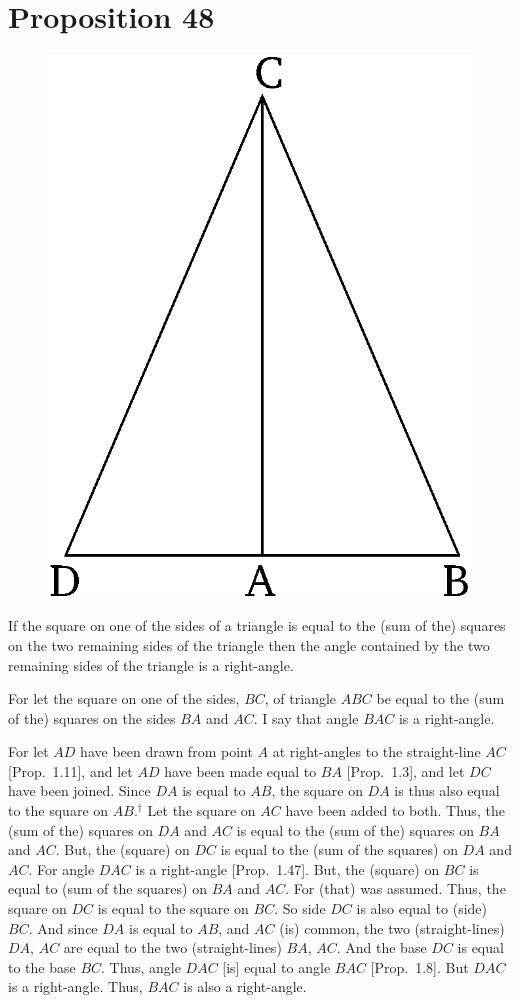 \chapter*{Proposition 48}



\begin{figure}[ht]
    \begin{center}
    \includegraphics[width=0.5\linewidth]{figures/fig48e.eps}
    \label{fig:prop_48}
    \end{center}
\end{figure}


If the square on one of the sides of a triangle is equal to the (sum of the)
squares on the two remaining sides of the triangle then the angle contained
by the two remaining sides of the triangle is a right-angle.

For let the square on one of the sides, $BC$, of triangle $ABC$ be equal
to the (sum of the) squares on the sides $BA$ and $AC$. I say that angle
$BAC$ is a right-angle.

For let $AD$ have been drawn from point $A$ at right-angles to the
straight-line $AC$ [Prop.~1.11], and let $AD$ have been made equal to
$BA$ [Prop.~1.3], and let $DC$ have been joined. Since $DA$ is equal to $AB$,
the square on $DA$ is thus also equal to the square on $AB$.$^\dag$ Let the square on
$AC$ have been added to both. Thus, the (sum of the) squares on $DA$ and $AC$ is equal
to the (sum of the) squares on $BA$ and $AC$. But, the (square) on $DC$ 
is equal to the (sum of the squares) on $DA$ and $AC$. For angle $DAC$ is a right-angle [Prop.~1.47].
But, the  (square) on $BC$ is equal to (sum of the squares) on $BA$ and $AC$.
For (that) was assumed. Thus, the square on $DC$ is equal to the square on $BC$.
So  side $DC$ is also equal to (side) $BC$. And since $DA$ is equal to $AB$, and $AC$ (is) common, the two (straight-lines) $DA$, $AC$ are equal to the two (straight-lines)
$BA$, $AC$. And the base $DC$ is equal to the base $BC$. Thus, angle $DAC$ [is] equal to angle $BAC$ [Prop.~1.8].  But $DAC$ is a right-angle. Thus, $BAC$ is
also a right-angle.

